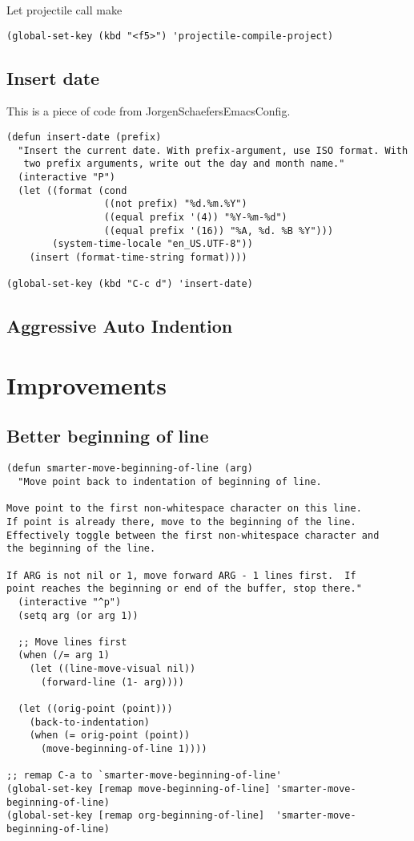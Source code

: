 \documentclass[12pt]{article}
\begin{document}
Let projectile call make

\begin{verbatim}
(global-set-key (kbd "<f5>") 'projectile-compile-project)
\end{verbatim}

\subsection{Insert date}
\label{sec:orga067124}
This is a piece of code from JorgenSchaefersEmacsConfig.
\begin{verbatim}
(defun insert-date (prefix)
  "Insert the current date. With prefix-argument, use ISO format. With
   two prefix arguments, write out the day and month name."
  (interactive "P")
  (let ((format (cond
                 ((not prefix) "%d.%m.%Y")
                 ((equal prefix '(4)) "%Y-%m-%d")
                 ((equal prefix '(16)) "%A, %d. %B %Y")))
        (system-time-locale "en_US.UTF-8"))
    (insert (format-time-string format))))

(global-set-key (kbd "C-c d") 'insert-date)
\end{verbatim}

\subsection{Aggressive Auto Indention}
\label{sec:org002ebcd}

\section{Improvements}
\label{sec:org103bbda}
\subsection{Better beginning of line}
\label{sec:org153420b}

\begin{verbatim}
(defun smarter-move-beginning-of-line (arg)
  "Move point back to indentation of beginning of line.

Move point to the first non-whitespace character on this line.
If point is already there, move to the beginning of the line.
Effectively toggle between the first non-whitespace character and
the beginning of the line.

If ARG is not nil or 1, move forward ARG - 1 lines first.  If
point reaches the beginning or end of the buffer, stop there."
  (interactive "^p")
  (setq arg (or arg 1))

  ;; Move lines first
  (when (/= arg 1)
    (let ((line-move-visual nil))
      (forward-line (1- arg))))

  (let ((orig-point (point)))
    (back-to-indentation)
    (when (= orig-point (point))
      (move-beginning-of-line 1))))

;; remap C-a to `smarter-move-beginning-of-line'
(global-set-key [remap move-beginning-of-line] 'smarter-move-beginning-of-line)
(global-set-key [remap org-beginning-of-line]  'smarter-move-beginning-of-line)
\end{verbatim}
\end{document}
